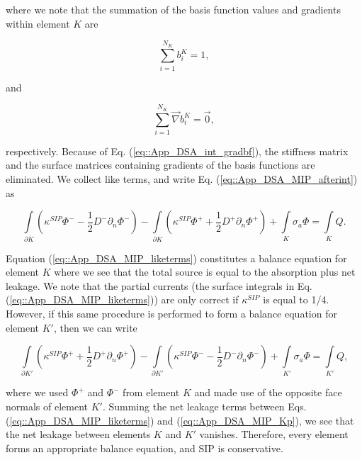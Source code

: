 \noindent where we note that the summation of the basis function values and gradients within element $K$ are

\begin{equation}
\label{eq::App_DSA_int_bf}
\sum\limits_{i=1}^{N_K} b_i^K = 1 ,
\end{equation}

\noindent and

\begin{equation}
\label{eq::App_DSA_int_gradbf}
\sum\limits_{i=1}^{N_K} \vec{\nabla} b_i^K = \vec{0} ,
\end{equation}

\noindent respectively. Because of Eq. (\ref{eq::App_DSA_int_gradbf}), the stiffness matrix and the surface matrices containing gradients of the basis functions are eliminated. We collect like terms, and write Eq. (\ref{eq::App_DSA_MIP_afterint}) as

\begin{equation}
\label{eq::App_DSA_MIP_liketerms}
 \int\limits_{\partial K} \left(  \kappa^{SIP}  \Phi^- - \frac{1}{2} D^- \partial_n  \Phi^- \right) -  \int\limits_{\partial K}   \left(  \kappa^{SIP}  \Phi^+ + \frac{1}{2} D^+ \partial_n \Phi^+ \right) + \int\limits_{K} \sigma_a   \Phi = \int\limits_{K}  Q .
\end{equation}

\noindent Equation (\ref{eq::App_DSA_MIP_liketerms}) constitutes a balance equation for element $K$ where we see that the total source is equal to the absorption plus net leakage. We note that the partial currents (the surface integrals in Eq. (\ref{eq::App_DSA_MIP_liketerms})) are only correct if $\kappa^{SIP} $ is equal to 1/4. However, if this same procedure is performed to form a balance equation for element $K'$, then we can write 

\begin{equation}
\label{eq::App_DSA_MIP_Kp}
 \int\limits_{\partial K'} \left(  \kappa^{SIP}  \Phi^+ + \frac{1}{2} D^+ \partial_n  \Phi^+ \right) -  \int\limits_{\partial K'}   \left(  \kappa^{SIP}  \Phi^- - \frac{1}{2} D^- \partial_n \Phi^- \right) + \int\limits_{K'} \sigma_a   \Phi = \int\limits_{K'}  Q ,
\end{equation}

\noindent where we used $\Phi^+$ and $\Phi^-$ from element $K$ and made use of the opposite face normals of element $K'$. Summing the net leakage terms between Eqs. (\ref{eq::App_DSA_MIP_liketerms}) and (\ref{eq::App_DSA_MIP_Kp}), we see that the net leakage between elements $K$ and $K'$ vanishes. Therefore, every element forms an appropriate balance equation, and SIP is conservative.
